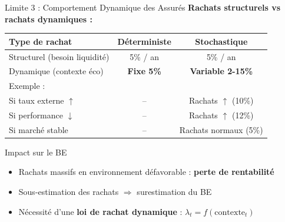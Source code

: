 \documentclass[10pt,aspectratio=169]{beamer}
\begin{document}
\begin{frame}{Limite 3 : Comportement Dynamique des Assurés}
\textbf{Rachats structurels vs rachats dynamiques :}

\begin{table}
\centering
\small
\begin{tabular}{lcc}
\toprule
\textbf{Type de rachat} & \textbf{Déterministe} & \textbf{Stochastique} \\
\midrule
Structurel (besoin liquidité) & 5\% / an & 5\% / an \\
\rowcolor{yellow!20}
Dynamique (contexte éco) & \textbf{Fixe 5\%} & \textbf{Variable 2-15\%} \\
\midrule
Exemple : & & \\
\quad Si taux externe $\uparrow$ & -- & Rachats $\uparrow$ (10\%) \\
\quad Si performance $\downarrow$ & -- & Rachats $\uparrow$ (12\%) \\
\quad Si marché stable & -- & Rachats normaux (5\%) \\
\bottomrule
\end{tabular}
\end{table}

\vspace{0.3cm}
\begin{alertblock}{Impact sur le BE}
\begin{itemize}
    \item Rachats massifs en environnement défavorable : \textbf{perte de rentabilité}
    \item Sous-estimation des rachats $\Rightarrow$ surestimation du BE
    \item Nécessité d'une \textbf{loi de rachat dynamique} : $\lambda_t = f(\text{contexte}_t)$
\end{itemize}
\end{alertblock}
\end{frame}
\end{document}
